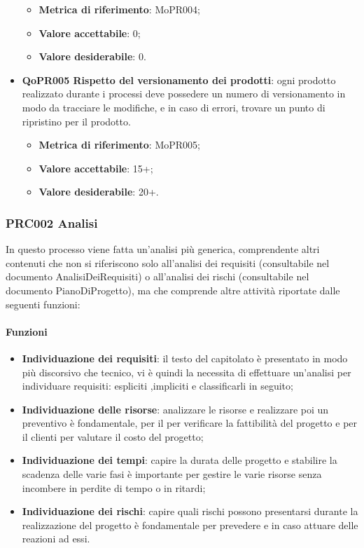 \documentclass[../piano-di-qualifica.tex]{subfiles}
\begin{document}
\begin{itemize}
        \begin{itemize}
            \item \textbf{Metrica di riferimento}: MoPR004;
            \item \textbf{Valore accettabile}: 0; %
            \item \textbf{Valore desiderabile}: 0.
        \end{itemize}
    \item \textbf{QoPR005 Rispetto del versionamento dei prodotti}: ogni prodotto realizzato durante i processi deve possedere un numero di versionamento in modo da tracciare le modifiche, e in caso di errori, trovare un punto di ripristino per il prodotto.
        \begin{itemize}
            \item \textbf{Metrica di riferimento}: MoPR005;
            \item \textbf{Valore accettabile}: 15+; %
            \item \textbf{Valore desiderabile}: 20+.
        \end{itemize}
\end{itemize}

\subsubsection{PRC002 Analisi}
\label{sub:analisi}
In questo processo viene fatta un'analisi più generica, comprendente altri contenuti che non si riferiscono solo all'analisi dei requisiti (consultabile nel documento AnalisiDeiRequisiti) o all'analisi dei rischi (consultabile nel documento PianoDiProgetto), ma che comprende altre attività riportate dalle seguenti funzioni:

\paragraph{Funzioni}
\label{sub:funzioni_2}
\begin{itemize}
    \item \textbf{Individuazione dei requisiti}: il testo del capitolato è presentato in modo più discorsivo che tecnico, vi è quindi la necessita di effettuare un'analisi per individuare requisiti: espliciti ,impliciti e classificarli in seguito;
    \item \textbf{Individuazione delle risorse}: analizzare le risorse e realizzare poi un preventivo è fondamentale, per il  per verificare la fattibilità del progetto e per il clienti per valutare il costo del progetto;
    \item \textbf{Individuazione dei tempi}: capire la durata delle progetto e stabilire la scadenza delle varie fasi è importante per gestire le varie risorse senza incombere in perdite di tempo o in ritardi;
    \item \textbf{Individuazione dei rischi}: capire quali rischi possono presentarsi durante la realizzazione del progetto è fondamentale per prevedere e in caso attuare delle reazioni ad essi.
\end{itemize}
\end{document}
